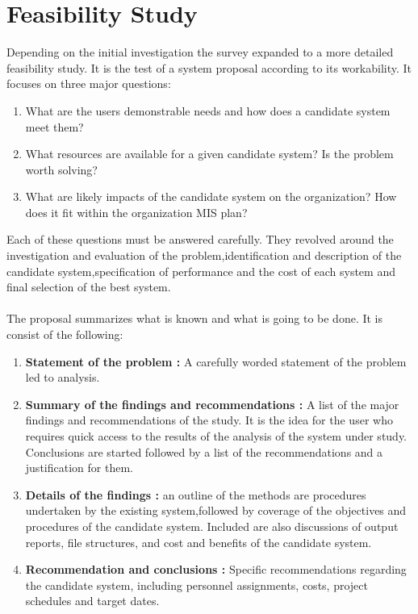 \documentclass[a4paper,12pt]{report}
\begin{document}
\section{Feasibility Study}
Depending on the initial investigation the survey expanded to a more detailed feasibility study. It is the test of a system proposal according to its workability. It focuses on three major questions:
\begin{enumerate}
	\item 	What are the users demonstrable needs and how does a candidate system meet them?
	\item	What resources are available for a given candidate system? Is the problem worth solving?
	\item	What are likely impacts of the candidate system on the organization? How does it fit within the organization MIS plan?
	\end{enumerate}
Each of these questions must be answered carefully. They revolved around the investigation and evaluation of the problem,identification and description of the candidate system,specification of performance and the cost of each system and final selection of the best system.\\ \\
The proposal summarizes what is known and what is going to be done. It is consist of the following:
\begin{enumerate}
	\item \textbf{Statement of the problem :} A carefully worded statement of the problem led to analysis.
	
	\item \textbf{	Summary of the findings and recommendations :} A list of the major findings and recommendations of the study. It is the idea for the user who requires quick access to the results of the analysis of the system under study. Conclusions are started followed by a list of the recommendations and a justification for them.
	
	\item \textbf{ Details of the findings :} an outline of the methods are procedures undertaken by the existing system,followed by coverage of the objectives and procedures of the candidate system. Included are also discussions of output reports, file structures, and cost and benefits of the candidate system.
	
	\item \textbf{	Recommendation and conclusions :} Specific recommendations regarding the candidate system, including personnel assignments, costs, project schedules and target dates.
\end{enumerate}
\end{document}
